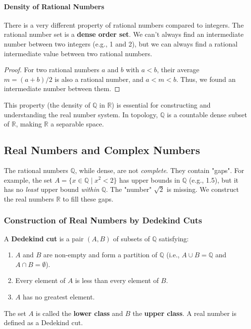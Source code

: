 \paragraph{Density of Rational Numbers}
There is a very different property of rational numbers compared to integers. The rational number set is a \textbf{dense order set}. We can’t always find an intermediate number between two integers (e.g., 1 and 2), but we can always find a rational intermediate value between two rational numbers.
\begin{proof}
For two rational numbers $a$ and $b$ with $a < b$, their average $m = (a+b)/2$ is also a rational number, and $a < m < b$. Thus, we found an intermediate number between them.
\end{proof}
This property (the density of $\mathbb{Q}$ in $\mathbb{R}$) is essential for constructing and understanding the real number system. In topology, $\mathbb{Q}$ is a countable dense subset of $\mathbb{R}$, making $\mathbb{R}$ a separable space.

\subsection{Real Numbers and Complex Numbers}
The rational numbers $\mathbb{Q}$, while dense, are not \emph{complete}. They contain "gaps". For example, the set $A = \{ x \in \mathbb{Q} \mid x^2 < 2 \}$ has upper bounds in $\mathbb{Q}$ (e.g., 1.5), but it has no \emph{least} upper bound \emph{within} $\mathbb{Q}$. The "number" $\sqrt{2}$ is missing. We construct the real numbers $\mathbb{R}$ to fill these gaps.

\subsubsection{Construction of Real Numbers by Dedekind Cuts}

\begin{definition}
A \textbf{Dedekind cut} is a pair $(A, B)$ of subsets of $\mathbb{Q}$ satisfying:
\begin{enumerate}
    \item $A$ and $B$ are non-empty and form a partition of $\mathbb{Q}$ (i.e., $A \cup B = \mathbb{Q}$ and $A \cap B = \emptyset$).
    \item Every element of $A$ is less than every element of $B$.
    \item $A$ has no greatest element.
\end{enumerate}
The set $A$ is called the \textbf{lower class} and $B$ the \textbf{upper class}. A real number is defined as a Dedekind cut.
\end{definition}

